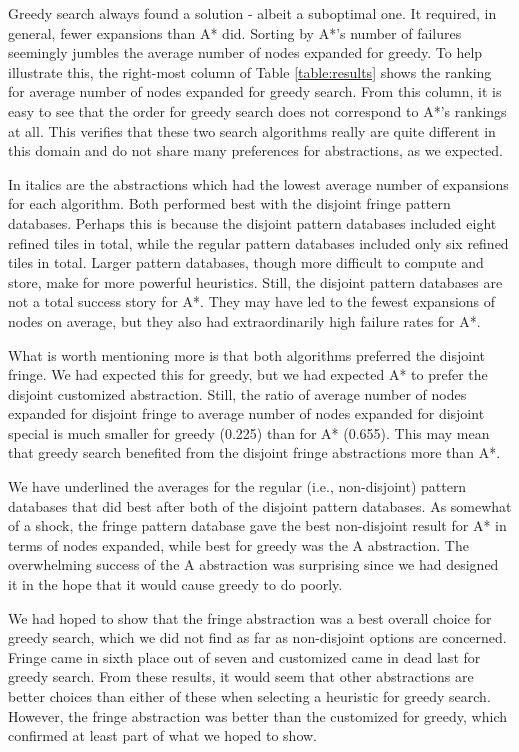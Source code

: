 \documentclass[letterpaper]{article}
\begin{document}
Greedy search always found a solution - albeit a suboptimal one. It required, in general, fewer expansions than A* did.  Sorting by A*'s number of failures seemingly jumbles the average number of nodes expanded for greedy.  To help illustrate this, the right-most column of Table \ref{table:results} shows the ranking for average number of nodes expanded for greedy search.  From this column, it is easy to see that the order for greedy search does not correspond to A*'s rankings at all.  This verifies that these two search algorithms really are quite different in this domain and do not share many preferences for abstractions, as we expected.

In italics are the abstractions which had the lowest average number of expansions for each algorithm.  Both performed best with the disjoint fringe pattern databases.  Perhaps this is because the disjoint pattern databases included eight refined tiles in total, while the regular pattern databases included only six refined tiles in total.  Larger pattern databases, though more difficult to compute and store, make for more powerful heuristics.  Still, the disjoint pattern databases are not a total success story for A*.  They may have led to the fewest expansions of nodes on average, but they also had extraordinarily high failure rates for A*.

What is worth mentioning more is that both algorithms preferred the disjoint fringe.  We had expected this for greedy, but we had expected A* to prefer the disjoint customized abstraction.  Still, the ratio of average number of nodes expanded for disjoint fringe to average number of nodes expanded for disjoint special is much smaller for greedy (0.225) than for A* (0.655).  This may mean that greedy search benefited from the disjoint fringe abstractions more than A*.

We have underlined the averages for the regular (i.e., non-disjoint) pattern databases that did best after both of the disjoint pattern databases.  As somewhat of a shock, the fringe pattern database gave the best non-disjoint result for A* in terms of nodes expanded, while best for greedy was the A abstraction.  The overwhelming success of the A abstraction was surprising since we had designed it in the hope that it would cause greedy to do poorly.

We had hoped to show that the fringe abstraction was a best overall choice for greedy search, which we did not find as far as non-disjoint options are concerned.  Fringe came in sixth place out of seven and customized came in dead last for greedy search.  From these results, it would seem that other abstractions are better choices than either of these when selecting a heuristic for greedy search.  However, the fringe abstraction was better than the customized for greedy, which confirmed at least part of what we hoped to show.  
\end{document}
